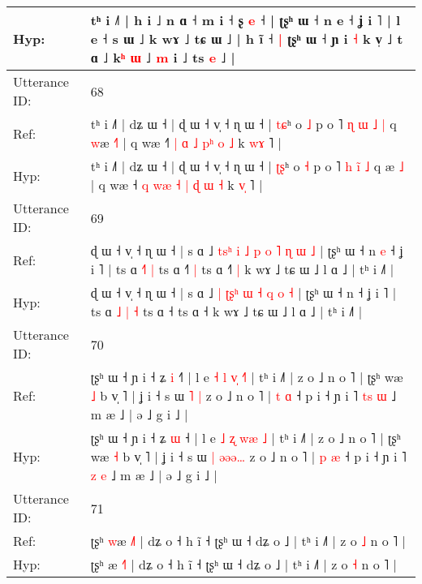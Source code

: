 \documentclass[10pt]{article}
\DeclareRobustCommand{\hl}[1]{{\textcolor{red}{#1}}}
\begin{document}
\begin{longtable}{ll}
 \\
Hyp: & tʰ i ˩˥ | h i ˩ n ɑ ˧ m i ˧ \hl{}ʂ\hl{} \hl{e} ˧ | ʈʂʰ ɯ ˧ n e ˧ ʝ i ˥ | l e ˧ \hl{}s\hl{} ɯ ˩ k wɤ ˩ tɕ ɯ ˩ | h ĩ ˧\hl{ }\hl{|} ʈʂʰ ɯ ˧ ɲ i \hl{˧} k v̩ ˩ t ɑ ˩ k\hl{}\hl{}\hl{}\hl{}\hl{}\hl{}\hl{}\hl{}\hl{}\hl{}\hl{}\hl{ʰ} \hl{}\hl{ɯ} ˩ \hl{m} i ˩ ts \hl{e} ˩ |
 \\
\midrule
Utterance ID: & 68 \\
Ref: & tʰ i ˩˥ | dʑ ɯ ˧ | ɖ ɯ ˧ v̩ ˧ ɳ ɯ ˧ | \hl{t}\hl{ɕ}ʰ o \hl{˩} p o ˥ \hl{ɳ} \hl{ɯ}\hl{ }\hl{˩} \hl{|} q \hl{w}æ \hl{˧}\hl{˥} | q wæ ˧\hl{˥} \hl{|} \hl{}\hl{ɑ} \hl{˩} \hl{}\hl{p}\hl{ʰ} \hl{o} \hl{˩} k \hl{w}\hl{ɤ} ˥ |
 \\
Hyp: & tʰ i ˩˥ | dʑ ɯ ˧ | ɖ ɯ ˧ v̩ ˧ ɳ ɯ ˧ | \hl{ʈ}\hl{ʂ}ʰ o \hl{˧} p o ˥ \hl{h} \hl{}\hl{i}\hl{̃} \hl{˩} q \hl{}æ \hl{}\hl{˩} | q wæ ˧\hl{} \hl{q} \hl{w}\hl{æ} \hl{˧} \hl{|}\hl{ }\hl{ɖ} \hl{ɯ} \hl{˧} k \hl{v}\hl{̩} ˥ |
 \\
\midrule
Utterance ID: & 69 \\
Ref: & ɖ ɯ ˧ v̩ ˧ ɳ ɯ ˧ | s ɑ ˩\hl{ }\hl{t}\hl{s}\hl{ʰ} \hl{i} \hl{˩}\hl{ }\hl{p} \hl{o} \hl{˥} \hl{ɳ} \hl{ɯ} \hl{˩} | ʈʂʰ ɯ ˧ n\hl{ }\hl{e} ˧ ʝ i ˥ | ts ɑ \hl{}\hl{˧}\hl{˥} \hl{|} ts ɑ ˧\hl{˥}\hl{ }\hl{|} ts ɑ ˧\hl{˥}\hl{ }\hl{|} k wɤ ˩ tɕ ɯ ˩ l ɑ ˩ | tʰ i ˩˥ |
 \\
Hyp: & ɖ ɯ ˧ v̩ ˧ ɳ ɯ ˧ | s ɑ ˩\hl{}\hl{}\hl{}\hl{} \hl{|} \hl{ʈ}\hl{ʂ}\hl{ʰ} \hl{ɯ} \hl{˧} \hl{q} \hl{o} \hl{˧} | ʈʂʰ ɯ ˧ n\hl{}\hl{} ˧ ʝ i ˥ | ts ɑ \hl{˩}\hl{ }\hl{|} \hl{˧} ts ɑ ˧\hl{}\hl{}\hl{} ts ɑ ˧\hl{}\hl{}\hl{} k wɤ ˩ tɕ ɯ ˩ l ɑ ˩ | tʰ i ˩˥ |
 \\
\midrule
Utterance ID: & 70 \\
Ref: & ʈʂʰ ɯ ˧ ɲ i ˧ ʑ \hl{i} ˧\hl{˥} | l e \hl{˧} \hl{l} \hl{v}\hl{̩} \hl{˧}\hl{˥} | tʰ i ˩˥ | z o ˩ n o ˥ | ʈʂʰ wæ \hl{˩} b v̩ ˥ | ʝ i ˧ s ɯ \hl{˥} \hl{}\hl{}\hl{}\hl{|} z o ˩ n o ˥ | \hl{t} \hl{ɑ} ˧ p i ˧ ɲ i ˥ \hl{t}\hl{s} \hl{ɯ} ˩ m æ ˩ | ə ˩ g i ˩ |
 \\
Hyp: & ʈʂʰ ɯ ˧ ɲ i ˧ ʑ \hl{ɯ} ˧\hl{} | l e \hl{˩} \hl{ʐ} \hl{w}\hl{æ} \hl{}\hl{˩} | tʰ i ˩˥ | z o ˩ n o ˥ | ʈʂʰ wæ \hl{˧} b v̩ ˥ | ʝ i ˧ s ɯ \hl{|} \hl{ə}\hl{ə}\hl{ə}\hl{…} z o ˩ n o ˥ | \hl{p} \hl{æ} ˧ p i ˧ ɲ i ˥ \hl{}\hl{z} \hl{e} ˩ m æ ˩ | ə ˩ g i ˩ |
 \\
\midrule
Utterance ID: & 71 \\
Ref: & ʈʂʰ \hl{w}æ \hl{˩}˥ | dʑ o ˧ h ĩ ˧ ʈʂʰ ɯ ˧ dʑ o ˩ | tʰ i ˩˥ | z o \hl{˩} n o ˥ |
 \\
Hyp: & ʈʂʰ \hl{}æ \hl{˧}˥ | dʑ o ˧ h ĩ ˧ ʈʂʰ ɯ ˧ dʑ o ˩ | tʰ i ˩˥ | z o \hl{˧} n o ˥ |
 \\

\end{longtable}
\end{document}
